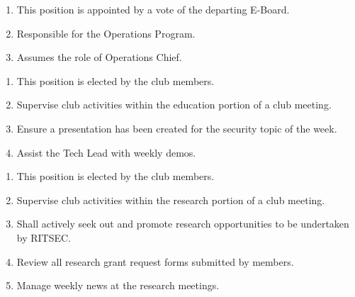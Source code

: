 
\begin{enumerate}
  \item This position is appointed by a vote of the departing E-Board.
  \item Responsible for the Operations Program.
  \item Assumes the role of Operations Chief.
\end{enumerate}


\begin{enumerate}
  \item This position is elected by the club members.
  \item Supervise club activities within the education portion of a club meeting.
  \item Ensure a presentation has been created for the security topic of the week.
  \item Assist the Tech Lead with weekly demos.
\end{enumerate}


\begin{enumerate}
  \item This position is elected by the club members.
  \item Supervise club activities within the research portion of a club meeting.
  \item Shall actively seek out and promote research opportunities to be undertaken by RITSEC.
  \item Review all research grant request forms submitted by members. 
  \item Manage weekly news at the research meetings.
\end{enumerate}
